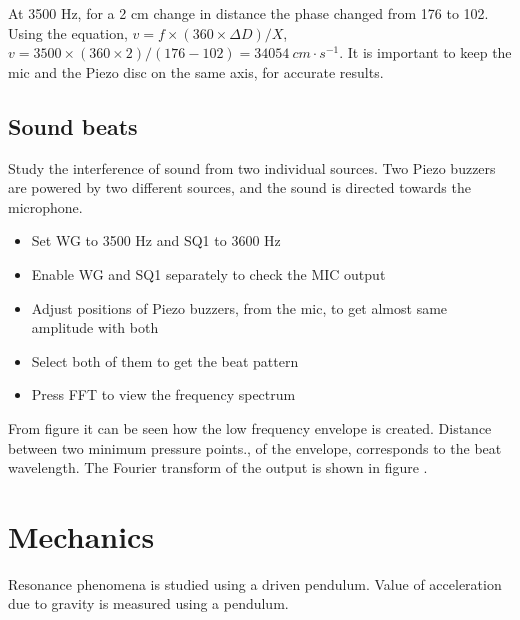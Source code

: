 \documentclass[a4paper,12pt,english]{sphinxmanual}
\let\sphinxpxdimen\pdfpxdimen\else\newdimen\sphinxpxdimen
\begin{document}

At 3500 Hz, for a 2 cm change in distance the phase changed from 176 to
102. Using the equation,
\(v = f \times (360 \times \Delta D)/X\), \(v = 3500 \times (360 \times 2)/(176 - 102) = 34054~cm\cdot s^{-1}\). It is important to keep the mic and the Piezo disc on the same
axis, for accurate results.


\section{Sound beats}
\label{\detokenize{5.3:sound-beats}}\label{\detokenize{5.3::doc}}

Study the interference of sound from two individual sources. Two Piezo
buzzers are powered by two different sources, and the sound is directed
towards the microphone.

\noindent\sphinxincludegraphics[width=300\sphinxpxdimen]{{sound-beats}.pdf}

\begin{itemize}
\item {} 
Set WG to 3500 Hz and SQ1 to 3600 Hz

\item {} 
Enable WG and SQ1 separately to check the MIC output

\item {} 
Adjust positions of Piezo buzzers, from the mic, to get almost same
amplitude with both

\item {} 
Select both of them to get the beat pattern

\item {} 
Press FFT to view the frequency spectrum

\end{itemize}


From figure it can be seen how the low frequency envelope is created.
Distance between two minimum pressure points., of the envelope,
corresponds to the beat wavelength. The Fourier transform of the output
is shown in figure .


\chapter{Mechanics}
\label{\detokenize{index:mechanics}}
Resonance phenomena is studied using a driven pendulum. Value of
acceleration due to gravity is measured using a pendulum.
\end{document}
